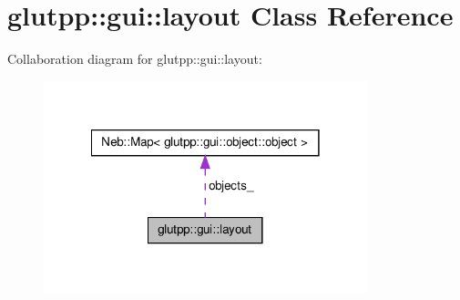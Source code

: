 \hypertarget{classglutpp_1_1gui_1_1layout}{\section{glutpp\-:\-:gui\-:\-:layout \-Class \-Reference}
\label{classglutpp_1_1gui_1_1layout}
}


\-Collaboration diagram for glutpp\-:\-:gui\-:\-:layout\-:
\nopagebreak
\begin{figure}[H]
\begin{center}
\leavevmode
\includegraphics[width=266pt]{classglutpp_1_1gui_1_1layout__coll__graph}
\end{center}
\end{figure}
